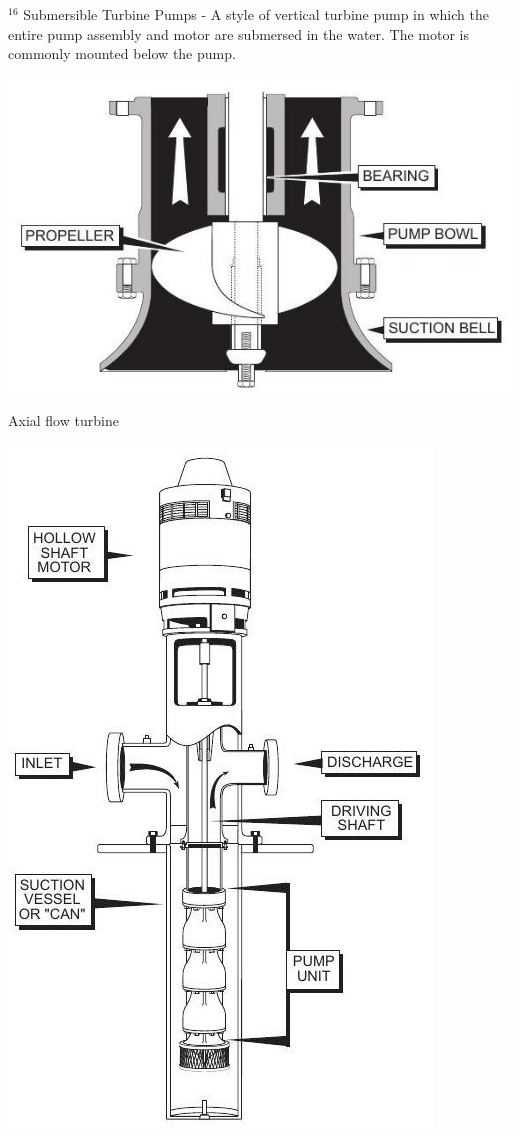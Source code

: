 \documentclass[10pt]{article}
\begin{document}
${ }^{16}$ Submersible Turbine Pumps - A style of vertical turbine pump in which the entire pump assembly and motor are submersed in the water. The motor is commonly mounted below the pump.

\includegraphics[max width=\textwidth]{AxialFlowTurbine}

Axial flow turbine

\includegraphics[max width=\textwidth]{CanTurbinePump}
\end{document}
